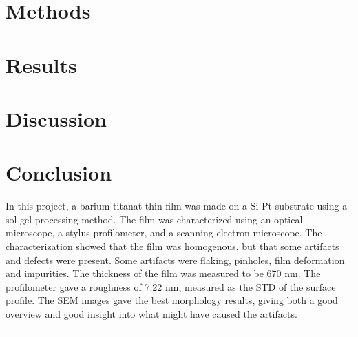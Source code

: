 \documentclass[5p,sort&compress]{elsarticle}
\begin{document}


\section{Methods}




\section{Results}


\section{Discussion}


\section{Conclusion}

\noindent In this project, a barium titanat thin film was made on a Si-Pt substrate using a sol-gel processing method.
The film was characterized using an optical microscope, a stylus profilometer, and a scanning electron microscope.
The characterization showed that the film was homogenous, but that some artifacts and defects were present.
Some artifacts were flaking, pinholes, film deformation and impurities.
The thickness of the film was measured to be 670 nm.
The profilometer gave a roughness of 7.22 nm, measured as the STD of the surface profile.
The SEM images gave the best morphology results, giving both a good overview and good insight into what might have caused the artifacts.



\begingroup
\begin{center}
  \rule{2cm}{.4pt}
\end{center}
\makeatletter
{}
\makeatother



\endgroup
\end{document}
